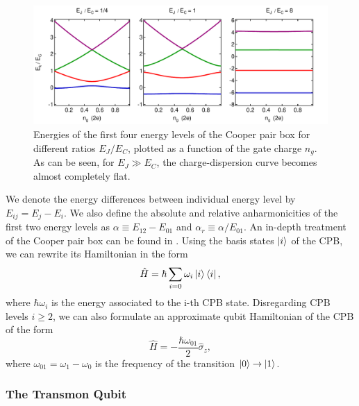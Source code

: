 \begin{figure}[ht!]
	\includegraphics[width=\textwidth]{"./material/mathematica/cooper_pair_box_energies"}
	\caption{Energies of the first four energy levels of the Cooper pair box for different ratios $E_J/E_C$, plotted as a function of the gate charge $n_g$. As can be seen, for $E_J \gg E_C$, the charge-dispersion curve becomes almost completely flat.}
	\label{fig:CooperPairBoxEnergies}
\end{figure}

We denote the energy differences between individual energy level by $E_{ij} = E_j - E_i$. We also define the absolute and relative anharmonicities of the first two energy levels as $\alpha \equiv E_{12}-E_{01}$ and $\alpha_r \equiv \alpha / E_{01}$. An in-depth treatment of the Cooper pair box can be found in \citep{cottet_implementation_2002}. Using the basis states $\left| i \right>$ of the CPB, we can rewrite its Hamiltonian in the form 
%
\begin{equation}
\hat{H} = \hbar\sum\limits_{i=0} \omega_i\left| i \right>\left< i \right|,
\end{equation}
%
where $\hbar\omega_i$ is the energy associated to the i-th CPB state. Disregarding CPB levels $i \ge 2$, we can also formulate an approximate qubit Hamiltonian of the CPB of the form
%
\begin{equation}
\hat{H} = -\frac{\hbar\omega_{01}}{2}\hat{\sigma}_z, \label{eq:cpb_qubit_hamiltonian}
\end{equation}
%
where $\omega_{01}=\omega_1-\omega_0$ is the frequency of the transition $\left| 0 \right>\to\left| 1 \right>$.

\subsubsection{The Transmon Qubit}

